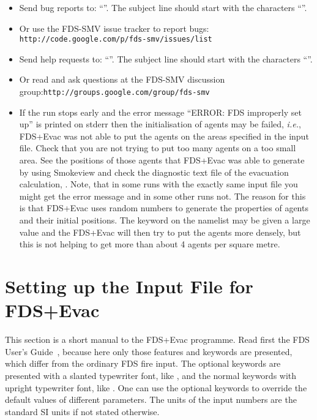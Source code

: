 \documentclass[12pt,a4paper,final,twoside]{stylevk}
\begin{document}
%
\begin{itemize}
\item Send bug reports to: ``''.  The
  subject line should start with the characters ``''.
%
\item Or use the FDS-SMV issue tracker to report bugs:\newline
  \texttt{http://code.google.com/p/fds-smv/issues/list} 
%
\item Send help requests to: ``''.  The
  subject line should start with the characters ``''.
%
\item Or read and ask questions at the FDS-SMV discussion
  group:\newline \texttt{http://groups.google.com/group/fds-smv}
%
\item If the run stops early and the error message ``ERROR: FDS
  improperly set up'' is printed on stderr then the initialisation of
  agents may be failed, \emph{i.e.}, FDS+Evac was not able to put the
  agents on the areas specified in the input file.  Check that you are
  not trying to put too many agents on a too small area.  See the
  positions of those agents that FDS+Evac was able to generate by
  using Smokeview and check the diagnostic text file of the evacuation
  calculation, .  Note, that in some runs with
  the exactly same input file you might get the error message and in
  some other runs not.  The reason for this is that FDS+Evac uses
  random numbers to generate the properties of agents and their
  initial positions.  The keyword  on the
   namelist may be given a large value and the FDS+Evac
  will then try to put the agents more densely, but this is not
  helping to get more than about 4 agents per square metre.
%
\end{itemize}

\clearpage

\newpage


\chapter{Setting up the Input File for
  FDS+Evac}\label{Sec_EvacInputFile}  

\noindent This section is a short manual to the FDS+Evac programme.
Read first the FDS User's Guide~\cite{FDS_UserGuide}, because here
only those features and keywords are presented, which differ from the
ordinary FDS fire input.  The optional keywords are presented with a
slanted typewriter font, like , and the normal keywords
with upright typewriter font, like .  One can use the
optional keywords to override the default values of different
parameters.  The units of the input numbers are the standard SI units
if not stated otherwise.
\end{document}
